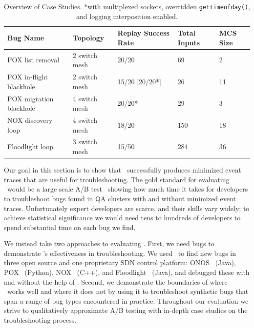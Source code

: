 \label{subsec:case_studies}

\begin{table}
\centering
\begin{tabular}{l|l|l|l|l}
Bug Name & Topology & Replay Success Rate & Total Inputs & MCS Size \\
\hline
POX list removal & 2 switch mesh & 20/20 & 69 & 2 \\
POX in-flight blackhole & 2 switch mesh & 15/20 [20/20*] & 26 & 11 \\
POX migration blackhole & 4 switch mesh & 20/20* & 29 & 3 \\
NOX discovery loop & 4 switch mesh & 18/20 & 150 & 18 \\
Floodlight loop & 3 switch mesh & 15/50 & 284 & 36 \\
\end{tabular}
\caption{Overview of Case Studies. \newline
\textmd{*with multiplexed sockets, overridden {\tt gettimeofday()}, and
logging interposition enabled.}}
\label{tab:case_studies}
\end{table}

Our goal in this section is to show that \simulator~successfully produces
minimized event traces that are useful for troubleshooting.
The gold standard for evaluating \simulator~would be a large scale A/B test~\cite{neyman}
showing how much time it takes for developers to troubleshoot bugs found in
QA clusters with and without minimized event traces. Unfortunately
expert developers are scarce, and their skills vary widely; to achieve statistical significance we would
need tens to hundreds of developers to spend substantial time on each bug we find.

We instead take two approaches to evaluating \simulator.
First, we need bugs to demonstrate \simulator's effectiveness in
troubleshooting. We used \projectname~to find new bugs in three open source and one proprietary SDN control platform:
ONOS~\cite{ONOS} (Java), POX~\cite{pox} (Python), NOX~\cite{nox} (C++), and
Floodlight~\cite{bigswitch} (Java), and debugged these with and
without the help of \simulator. Second, we demonstrate the
boundaries of where \simulator~works well and where it does not by using it to
troubleshoot synthetic bugs that span a range of bug types encountered in
practice. Throughout our evaluation we strive to qualitatively approximate A/B testing
with in-depth case studies on the troubleshooting process.

